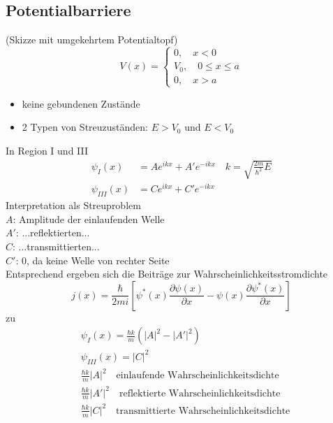 \documentclass[10pt,article,colorback,accentcolor=tud9d]{scrartcl}
\begin{document}
\subsection{Potentialbarriere}
(Skizze mit umgekehrtem Potentialtopf)
\begin{equation}
V(x)=\left\{
\begin{aligned}
0,\quad x<0\\
V_0,\quad 0\leq x\leq a\\
0,\quad x>a
\end{aligned}
\right.
\end{equation}
\begin{itemize}
	\item keine gebundenen Zustände
  \item 2 Typen von Streuzuständen: $E>V_0$ und $E<V_0$
\end{itemize}
In Region I und III
\begin{align}
\psi_{I}(x)&=Ae^{ikx}+A'e^{-ikx} \quad k=\sqrt{\frac{2m}{\hbar^2}E}\\
\psi_{III}(x)&=Ce^{ikx}+C'e^{-ikx}
\end{align}
Interpretation als Streuproblem\\
$A$: Amplitude der einlaufenden Welle\\
$A'$: ...reflektierten...\\
$C$: ...transmittierten...\\
$C'$: 0, da keine Welle von rechter Seite\\
Entsprechend ergeben sich die Beiträge zur Wahrscheinlichkeitsstromdichte
\begin{equation}
j(x)=\frac{\hbar}{2mi}\left[\psi^*(x)\frac{\partial\psi(x)}{\partial x}-\psi(x)\frac{\partial\psi^*(x)}{\partial x}\right]
\end{equation}
zu
\begin{align}
&\psi_{I}(x)=\frac{\hbar k}{m}\left(|A|^2-|A'|^2\right)\\
&\psi_{III}(x)=|C|^2\\
&\frac{\hbar k}{m}|A|^2\quad \text{einlaufende Wahrscheinlichkeitsdichte}\\
&\frac{\hbar k}{m}|A'|^2\quad \text{reflektierte Wahrscheinlichkeitsdichte}\\
&\frac{\hbar k}{m}|C|^2\quad \text{transmittierte Wahrscheinlichkeitsdichte}
\end{align}
\end{document}
